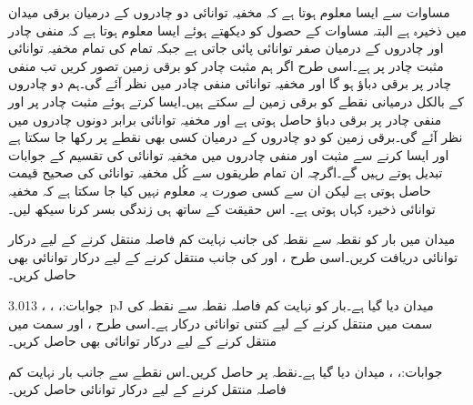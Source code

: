 مساوات  سے ایسا معلوم ہوتا ہے کہ مخفیہ توانائی دو چادروں کے درمیان برقی میدان میں ذخیرہ ہے البتہ مساوات  کے حصول کو دیکھتے ہوئے  ایسا معلوم ہوتا ہے کہ منفی چادر اور چادروں کے درمیان صفر توانائی پائی جاتی ہے جبکہ تمام کی تمام مخفیہ توانائی مثبت چادر پر ہے۔اسی طرح اگر ہم مثبت چادر کو برقی زمین تصور کریں تب منفی چادر پر برقی دباؤ  ہو گا اور مخفیہ توانائی منفی چادر میں نظر آئے گی۔ہم دو چادروں کے بالکل درمیانی نقطے کو برقی زمین لے سکتے ہیں۔ایسا کرتے ہوئے مثبت چادر پر  اور منفی چادر پر  برقی دباؤ حاصل ہوتی ہے اور مخفیہ توانائی برابر دونوں چادروں میں نظر آئے گی۔برقی زمین کو دو چادروں کے درمیان کسی بھی نقطے پر رکھا جا سکتا ہے اور ایسا کرنے سے مثبت اور منفی چادروں میں مخفیہ توانائی کی تقسیم کے  جوابات تبدیل ہوتے رہیں گے۔اگرچہ ان تمام طریقوں سے کُل مخفیہ توانائی کی صحیح قیمت حاصل ہوتی ہے لیکن ان سے کسی صورت یہ معلوم نہیں کیا جا سکتا ہے کہ مخفیہ توانائی ذخیرہ کہاں ہوتی ہے۔ اس حقیقت کے ساتھ ہی زندگی بسر کرنا سیکھ لیں۔ 


\newpage
{}

میدان  میں  بار کو نقطہ  سے
 نقطہ  کی جانب نہایت کم فاصلہ  منتقل کرنے کے لیے درکار توانائی دریافت کریں۔اسی طرح ،  اور  کی جانب منتقل کرنے کے لیے درکار توانائی بھی حاصل کریں۔

جوابات:، ، ، {\SI{3.013}{\pico\joule}}
میدان  دیا گیا ہے۔بار  کو نہایت کم فاصلہ  نقطہ  سے نقطہ  کی سمت میں منتقل کرنے کے لیے کتنی توانائی درکار ہے۔اسی طرح ،  اور  سمت میں منتقل کرنے کے لیے درکار توانائی بھی حاصل کریں۔

جوابات:، ، 
میدان  دیا گیا ہے۔نقطہ  پر  حاصل کریں۔اس نقطے سے  جانب  بار نہایت کم فاصلہ  منتقل کرنے کے لیے درکار توانائی حاصل کریں۔
 
